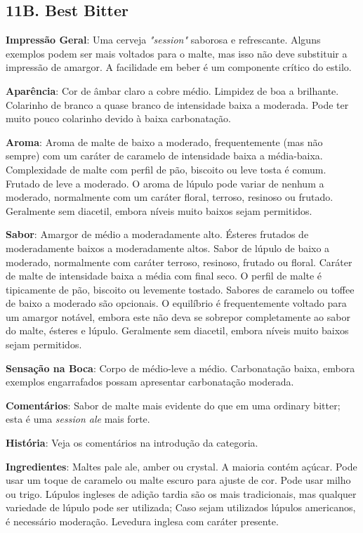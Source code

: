 \subsection*{11B. Best Bitter}
\textbf{Impressão Geral}: Uma cerveja \textit{"session"} saborosa e refrescante. Alguns exemplos podem ser mais voltados para o malte, mas isso não deve substituir a impressão de amargor. A facilidade em beber é um componente crítico do estilo.

\textbf{Aparência}: Cor de âmbar claro a cobre médio. Limpidez de boa a brilhante. Colarinho de branco a quase branco de intensidade baixa a moderada. Pode ter muito pouco colarinho devido à baixa carbonatação.

\textbf{Aroma}: Aroma de malte de baixo a moderado, frequentemente (mas não sempre) com um caráter de caramelo de intensidade baixa a média-baixa. Complexidade de malte com perfil de pão, biscoito ou leve tosta é comum. Frutado de leve a moderado. O aroma de lúpulo pode variar de nenhum a moderado, normalmente com um caráter floral, terroso, resinoso ou frutado. Geralmente sem diacetil, embora níveis muito baixos sejam permitidos.

\textbf{Sabor}: Amargor de médio a moderadamente alto. Ésteres frutados de moderadamente baixos a moderadamente altos. Sabor de lúpulo de baixo a moderado, normalmente com caráter terroso, resinoso, frutado ou floral. Caráter de malte de intensidade baixa a média com final seco. O perfil de malte é tipicamente de pão, biscoito ou levemente tostado. Sabores de caramelo ou toffee de baixo a moderado são opcionais. O equilíbrio é frequentemente voltado para um amargor notável, embora este não deva se sobrepor completamente ao sabor do malte, ésteres e lúpulo. Geralmente sem diacetil, embora níveis muito baixos sejam permitidos.

\textbf{Sensação na Boca}: Corpo de médio-leve a médio. Carbonatação baixa, embora exemplos engarrafados possam apresentar carbonatação moderada.

\textbf{Comentários}: Sabor de malte mais evidente do que em uma ordinary bitter; esta é uma \textit{session ale} mais forte.

\textbf{História}: Veja os comentários na introdução da categoria.

\textbf{Ingredientes}: Maltes pale ale, amber ou crystal. A maioria contém açúcar. Pode usar um toque de caramelo ou malte escuro para ajuste de cor. Pode usar milho ou trigo. Lúpulos ingleses de adição tardia são os mais tradicionais, mas qualquer variedade de lúpulo pode ser utilizada; Caso sejam utilizados lúpulos americanos, é necessário moderação. Levedura inglesa com caráter presente.

